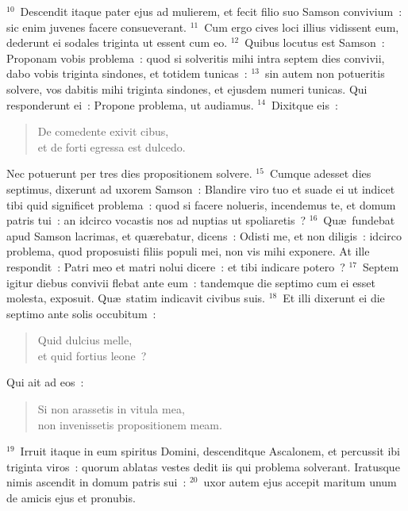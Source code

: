 ${}^{10}$~Descendit itaque pater ejus ad mulierem, et fecit filio suo Samson convivium~: sic enim juvenes facere consueverant.
${}^{11}$~Cum ergo cives loci illius vidissent eum, dederunt ei sodales triginta ut essent cum eo.
${}^{12}$~Quibus locutus est Samson~: Proponam vobis problema~: quod si solveritis mihi intra septem dies convivii, dabo vobis triginta sindones, et totidem tunicas~:
${}^{13}$~sin autem non potueritis solvere, vos dabitis mihi triginta sindones, et ejusdem numeri tunicas. Qui responderunt ei~: Propone problema, ut audiamus.
${}^{14}$~Dixitque eis~: \begin{flushleft}\begin{verse}De comedente exivit cibus,\\ et de forti egressa est dulcedo.\end{verse}\end{flushleft}

 Nec potuerunt per tres dies propositionem solvere.
${}^{15}$~Cumque adesset dies septimus, dixerunt ad uxorem Samson~: Blandire viro tuo et suade ei ut indicet tibi quid significet problema~: quod si facere nolueris, incendemus te, et domum patris tui~: an idcirco vocastis nos ad nuptias ut spoliaretis~?
${}^{16}$~Qu\ae\ fundebat apud Samson lacrimas, et qu\ae rebatur, dicens~: Odisti me, et non diligis~: idcirco problema, quod proposuisti filiis populi mei, non vis mihi exponere. At ille respondit~: Patri meo et matri nolui dicere~: et tibi indicare potero~?
${}^{17}$~Septem igitur diebus convivii flebat ante eum~: tandemque die septimo cum ei esset molesta, exposuit. Qu\ae\ statim indicavit civibus suis.
${}^{18}$~Et illi dixerunt ei die septimo ante solis occubitum~: \begin{flushleft}\begin{verse}Quid dulcius melle,\\ et quid fortius leone~?\end{verse}\end{flushleft}

 Qui ait ad eos~: \begin{flushleft}\begin{verse}Si non arassetis in vitula mea,\\ non invenissetis propositionem meam.\end{verse}\end{flushleft}


${}^{19}$~Irruit itaque in eum spiritus Domini, descenditque Ascalonem, et percussit ibi triginta viros~: quorum ablatas vestes dedit iis qui problema solverant. Iratusque nimis ascendit in domum patris sui~:
${}^{20}$~uxor autem ejus accepit maritum unum de amicis ejus et pronubis.

